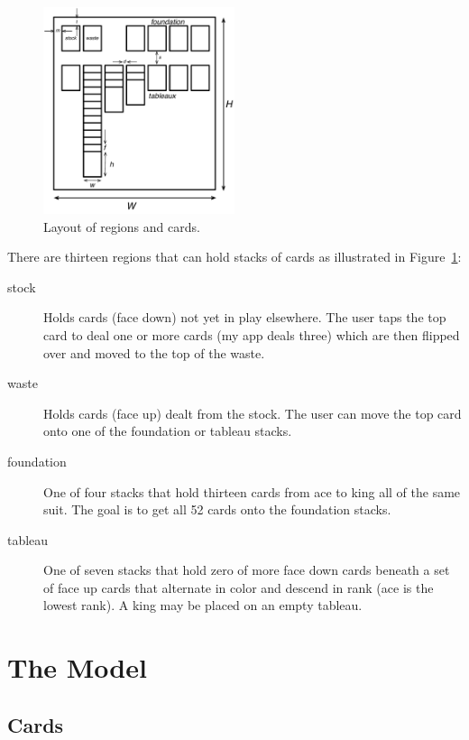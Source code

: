 \documentclass[11pt]{article}
\begin{document}
\begin{figure}[ht!] %
   \centering
   \includegraphics[width=0.5\textwidth]{card-table} 
   \caption{Layout of regions and cards.}
   \label{fig:card-table}
\end{figure}

There are thirteen regions that can hold stacks of cards
as illustrated in Figure~\ref{fig:card-table}:
\begin{description}
\item[stock] Holds cards (face down) not yet in play elsewhere.
  The user taps the top card to deal one or more cards (my app deals three)
  which are
  then flipped over and moved to the top of the waste.
\item[waste] Holds cards (face up) dealt from the stock. The user
  can move the top card onto one of the foundation or tableau stacks.
\item[foundation] One of four stacks that hold thirteen cards from ace to king
  all of the same suit. The goal is to get all 52 cards onto the foundation
  stacks.
\item[tableau] One of seven stacks that hold zero of more face down cards beneath
  a set of face up cards that alternate in color and descend in rank (ace is the
  lowest rank). A king may be placed on an empty tableau.
\end{description}



\section{The Model} \label{sec:model}

\subsection{Cards}
\end{document}
